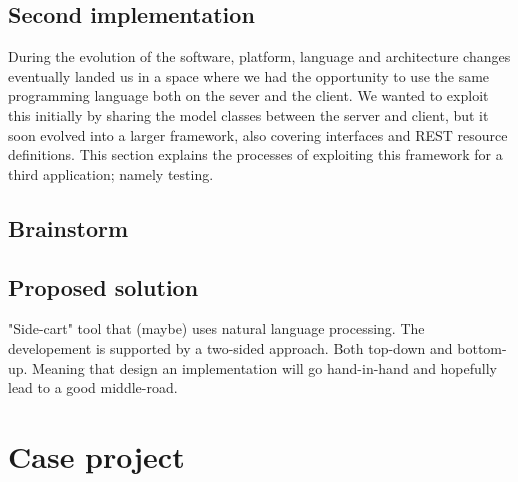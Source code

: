 \documentclass[10pt]{scrreprt}
\begin{document}
\section{Second implementation}
During the evolution of the software, platform, language and architecture changes eventually landed us in a space where we had the opportunity to use the same programming language both on the sever and the client. We wanted to exploit this initially by sharing the model classes between the server and client, but it soon evolved into a larger framework, also covering interfaces and REST resource definitions. This section explains the processes of exploiting this framework for a third application; namely testing.



\section{Brainstorm}


\section{Proposed solution}
"Side-cart" tool that (maybe) uses natural language processing. The developement is supported by a two-sided approach. Both top-down and bottom-up. Meaning that design an implementation will go hand-in-hand and hopefully lead to a good middle-road.

\chapter{Case project}

\end{document}
